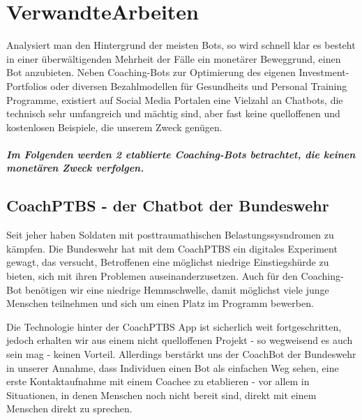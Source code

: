 \chapter{VerwandteArbeiten}

Analysiert man den Hintergrund der meisten Bots, so wird schnell klar \- es besteht in einer überwältigenden Mehrheit der Fälle ein monetärer Beweggrund, einen Bot anzubieten. Neben Coaching-Bots zur Optimierung des eigenen Investment-Portfolios oder diversen Bezahlmodellen für Gesundheits\- und Personal Training Programme, existiert auf Social Media Portalen eine Vielzahl an Chatbots, die technisch sehr umfangreich und mächtig sind, aber fast keine quelloffenen und kostenlosen Beispiele, die unserem Zweck genügen. \\

    \paragraph{Im Folgenden werden 2 etablierte Coaching-Bots betrachtet, die keinen monetären Zweck verfolgen.}

    \section{CoachPTBS - der Chatbot der Bundeswehr}
    Seit jeher haben Soldaten mit posttraumathischen Belastungssysndromen zu kämpfen. Die Bundeswehr hat mit dem CoachPTBS ein digitales Experiment gewagt, das versucht, Betroffenen eine möglichst niedrige Einstiegshürde zu bieten, sich mit ihren Problemen auseinanderzusetzen. Auch für den Coaching-Bot benötigen wir eine niedrige Hemmschwelle, damit möglichst viele junge Menschen teilnehmen und sich um einen Platz im Programm bewerben.


    Die Technologie hinter der CoachPTBS App ist sicherlich weit fortgeschritten, jedoch erhalten wir aus einem nicht quelloffenen Projekt - so wegweisend es auch sein mag - keinen Vorteil. Allerdings berstärkt uns der CoachBot der Bundeswehr in unserer Annahme, dass Individuen einen Bot als einfachen Weg sehen, eine erste Kontaktaufnahme mit einem Coachee zu etablieren - vor allem in Situationen, in denen Menschen noch nicht bereit sind, direkt mit einem Menschen direkt zu sprechen.


